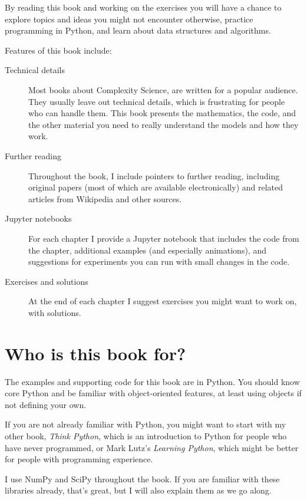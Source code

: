 \documentclass[12pt]{book}
\theoremstyle{exercise}
\begin{document}
By reading this book and working on the exercises you will have a chance to explore topics and ideas you might not encounter otherwise, practice programming in Python, and learn about data structures and algorithms.

Features of this book include:

\begin{description}

\item[Technical details] Most books about Complexity Science,
  are written for a popular audience.  They usually leave out
  technical details, which is frustrating for people who can handle
  them.  This book presents the mathematics, the code, and the other
  material you need to really understand the models and how they work.

\item[Further reading] Throughout the book, I include pointers to
  further reading, including original papers (most of which are
  available electronically) and related articles from Wikipedia and
  other sources.

\item[Jupyter notebooks] For each chapter I provide a Jupyter notebook
  that includes the code from the chapter, additional examples (and
  especially animations), and suggestions for experiments you can run
  with small changes in the code.

\item[Exercises and solutions] At the end of each chapter I suggest
  exercises you might want to work on, with solutions.

\end{description}


\section{Who is this book for?}

The examples and supporting code for this book are in Python.  You
should know core Python and be familiar with object-oriented features, at least using objects if not defining your own.

If you are not already familiar with Python, you might want to start
with my other book, {\it Think Python}, which is an introduction to
Python for people who have never programmed, or Mark
Lutz's {\it Learning Python}, which might be better for people with
programming experience.

I use NumPy and SciPy throughout the book.  If you are familiar with these libraries already, that's great, but I will also explain them as we go along.
\end{document}
